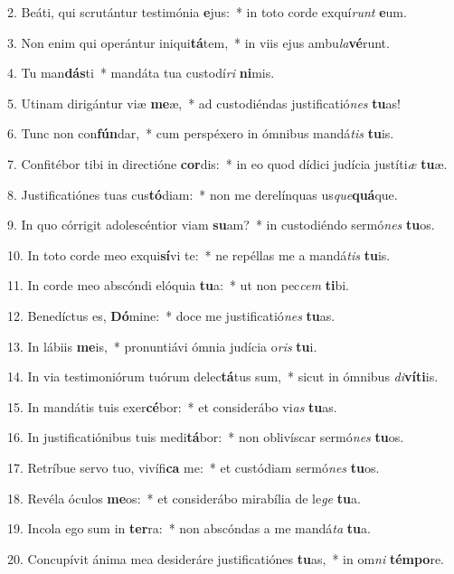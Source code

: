 2. Beáti, qui scrutántur testimónia \textbf{e}jus:~*  in toto corde exquí\textit{runt} \textbf{e}um.\

3. Non enim qui operántur iniqui\textbf{tá}tem,~*  in viis ejus ambu\textit{la}\textbf{vé}runt.\

4. Tu man\textbf{dás}ti~*  mandáta tua custodí\textit{ri} \textbf{ni}mis.\

5. Utinam dirigántur viæ \textbf{me}æ,~*  ad custodiéndas justificatió\textit{nes} \textbf{tu}as!\

6. Tunc non con\textbf{fún}dar,~*  cum perspéxero in ómnibus mandá\textit{tis} \textbf{tu}is.\

7. Confitébor tibi in directióne \textbf{cor}dis:~*  in eo quod dídici judícia justíti\textit{æ} \textbf{tu}æ.\

8. Justificatiónes tuas cus\textbf{tó}diam:~*  non me derelínquas us\textit{que}\textbf{quá}que.\

9. In quo córrigit adolescéntior viam \textbf{su}am?~*  in custodiéndo sermó\textit{nes} \textbf{tu}os.\

10. In toto corde meo exqui\textbf{sí}vi te:~*  ne repéllas me a mandá\textit{tis} \textbf{tu}is.\

11. In corde meo abscóndi elóquia \textbf{tu}a:~*  ut non pec\textit{cem} \textbf{ti}bi.\

12. Benedíctus es, \textbf{Dó}mine:~*  doce me justificatió\textit{nes} \textbf{tu}as.\

13. In lábiis \textbf{me}is,~*  pronuntiávi ómnia judícia o\textit{ris} \textbf{tu}i.\

14. In via testimoniórum tuórum delec\textbf{tá}tus sum,~*  sicut in ómnibus \textit{di}\textbf{ví}\textbf{ti}is.\

15. In mandátis tuis exer\textbf{cé}bor:~*  et considerábo vi\textit{as} \textbf{tu}as.\

16. In justificatiónibus tuis medi\textbf{tá}bor:~*  non oblivíscar sermó\textit{nes} \textbf{tu}os.\

17. Retríbue servo tuo, vivífi\textbf{ca} me:~*  et custódiam sermó\textit{nes} \textbf{tu}os.\

18. Revéla óculos \textbf{me}os:~*  et considerábo mirabília de le\textit{ge} \textbf{tu}a.\

19. Incola ego sum in \textbf{ter}ra:~*  non abscóndas a me mandá\textit{ta} \textbf{tu}a.\

20. Concupívit ánima mea desideráre justificatiónes \textbf{tu}as,~*  in om\textit{ni} \textbf{tém}\textbf{po}re.\


